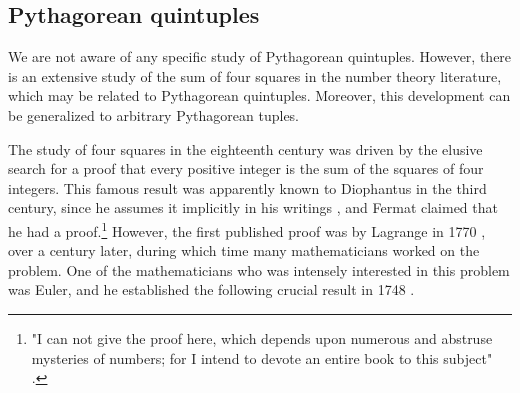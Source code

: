 \documentclass[11pt]{article}
\begin{document}
\subsection{Pythagorean quintuples}

We are not aware of any specific study of Pythagorean quintuples.
However, there is an extensive study of the sum of four squares in the 
number theory literature, which may be related to Pythagorean quintuples.
Moreover, this development can be generalized to arbitrary Pythagorean tuples.

The study of four squares in the eighteenth century
was driven by the elusive search for a proof that
every positive integer is the sum of the squares of four integers.
This famous result was apparently known to Diophantus in the third century,
since he assumes it implicitly in his writings \cite{dickson52}, %
and Fermat %
claimed that he had a proof.\footnote{"I can
	not give the proof here, which depends upon numerous and abstruse
	mysteries of numbers; for I intend to devote an entire book
	to this subject" \cite[p. 6]{dickson52}.}
However, the first published proof was by Lagrange in 1770 \cite{herstein75}, %
over a century later,
during which time many mathematicians worked on the problem.
One of the mathematicians who was intensely interested in this problem was Euler, 
and he established the following crucial result in 1748 \cite{weil84}.   
\end{document}

